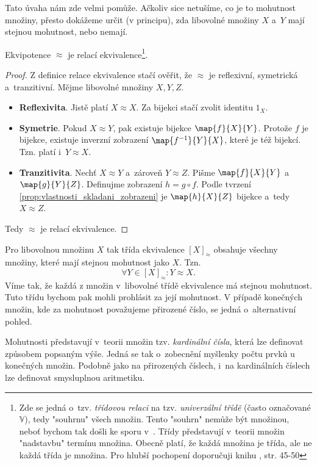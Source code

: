 Tato úvaha nám zde velmi pomůže. Ačkoliv sice netušíme, co je to mohutnost množiny, přesto dokážeme určit (v principu), zda libovolné množiny $X$ a~$Y$ mají stejnou mohutnost, nebo nemají.
\begin{lemma}
    Ekvipotence $\approx$ je relací ekvivalence\footnote{Zde se jedná o~tzv. \emph{třídovou relaci} na tzv. \emph{univerzální třídě} (často označované $\mathbb{V}$), tedy "souhrnu" všech množin. Tento "souhrn" nemůže být množinou, neboť bychom tak došli ke sporu v~\ZF{}. Třídy představují v~teorii množin "nadstavbu" termínu množina. Obecně platí, že každá množina je třída, ale ne každá třída je množina. Pro hlubší pochopení doporučuji knihu \cite{BalcarStepanek1986}, str. 45-50}.
\end{lemma}
\begin{proof}
    Z definice relace ekvivalence stačí ověřit, že $\approx$ je reflexivní, symetrická a~tranzitivní. Mějme libovolné množiny $X,Y,Z$.
    \begin{itemize}
        \item \textbf{Reflexivita}. Jistě platí $X\approx X$. Za bijekci stačí zvolit identitu $1_X$.
        \item \textbf{Symetrie}. Pokud $X\approx Y$, pak existuje bijekce $\map{f}{X}{Y}$. Protože $f$ je bijekce, existuje inverzní zobrazení $\map{f^{-1}}{Y}{X}$, které je též bijekcí. Tzn. platí i~$Y\approx X$.
        \item \textbf{Tranzitivita}. Nechť $X\approx Y$ a~zároveň $Y\approx Z$. Pišme $\map{f}{X}{Y}$ a~$\map{g}{Y}{Z}$. Definujme zobrazení $h=g\circ f$. Podle tvrzení \ref{prop:vlastnosti_skladani_zobrazeni} je $\map{h}{X}{Z}$ bijekce a~tedy $X\approx Z$.
    \end{itemize}
    Tedy $\approx$ je relací ekvivalence.
\end{proof}
Pro libovolnou množinu $X$ tak třída ekvivalence $[X]_\approx$ obsahuje všechny množiny, které mají stejnou mohutnost jako $X$. Tzn.
\begin{equation*}
    \forall Y\in [X]_\approx: Y\approx X.
\end{equation*}
Víme tak, že každá z množin v~libovolné třídě ekvivalence má stejnou mohutnost. Tuto třídu bychom pak mohli prohlásit za její mohutnost. V případě konečných množin, kde za mohutnost považujeme přirozené číslo, se jedná o~alternativní pohled.\par
Mohutnosti představují v~teorii množin tzv. \emph{kardinální čísla}, která lze definovat způsobem popsaným výše. Jedná se tak o~zobecnění myšlenky počtu prvků u konečných množin. Podobně jako na přirozených číslech, i~na kardinálních číslech lze definovat smysluplnou aritmetiku.